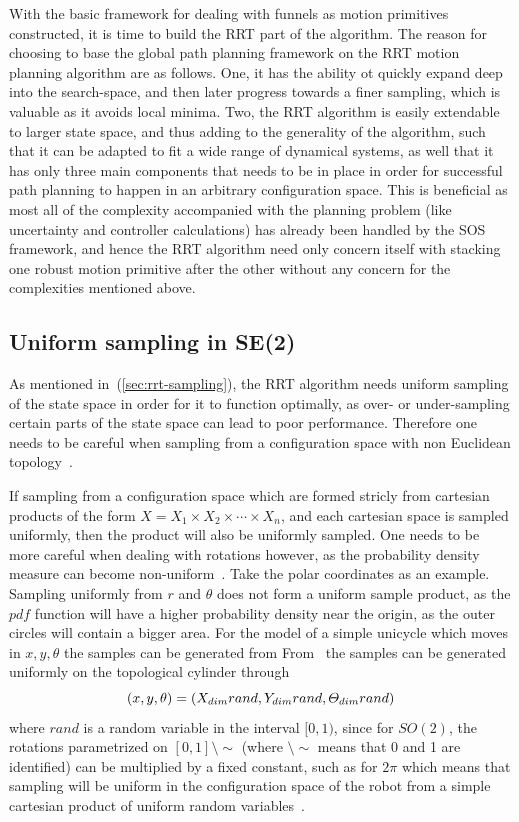 With the basic framework for dealing with funnels as motion primitives
constructed, it is time to build the \ac{RRT} part of the \rrtfunnel{}
algorithm. The reason for choosing to base the global path planning framework on
the \ac{RRT} motion planning algorithm are as follows. One, it has the ability
ot quickly expand deep into the search-space, and then later progress towards a
finer sampling, which is valuable as it avoids local minima. Two, the \ac{RRT}
algorithm is easily extendable to larger state space, and thus adding to the
generality of the \rrtfunnel{} algorithm, such that it can be adapted to fit a
wide range of dynamical systems, as well that it has only three main components
that needs to be in place in order for successful path planning to happen in an
arbitrary configuration space. This is beneficial as most all of the complexity
accompanied with the planning problem (like uncertainty and controller
calculations) has already been handled by the \ac{SOS} framework, and hence the
\ac{RRT} algorithm need only concern itself with stacking one robust motion
primitive after the other without any concern for the complexities mentioned
above.

\subsection{Uniform sampling in SE(2)}

As mentioned in~(\ref{sec:rrt-sampling}), the \ac{RRT} algorithm needs
uniform sampling of the state space in order for it to function optimally, as
over- or under-sampling certain parts of the state space can lead to poor
performance. Therefore one needs to be careful when sampling from a
configuration space with non Euclidean
topology~\cite{kuffnerEffectiveSamplingDistance2004}.

If sampling from a configuration space which are formed stricly from cartesian
products of the form \(X = X_1\times X_2\times \cdots \times X_n\), and each cartesian
space is sampled uniformly, then the product will also be uniformly sampled. One
needs to be more careful when dealing with rotations however, as the probability
density measure can become non-uniform~\cite{Lav06}. Take the polar coordinates
as an example. Sampling uniformly from \(r\) and \(\theta\) does not form a
uniform sample product, as the \(pdf\) function will have a higher probability
density near the origin, as the outer circles will contain a bigger area. For
the model of a simple unicycle which moves in \(x,y,\theta\) the samples can be
generated from From~\cite{kuffnerEffectiveSamplingDistance2004} the samples can
be generated uniformly on the topological cylinder through
\[
  (x,y,\theta) = (\mathnormal{X}_{dim}rand, \mathnormal{Y}_{dim}rand, \mathnormal{\Theta}_{dim}rand)
\]
where \(rand\) is a random variable in the interval \([0,1)\), since for
\(SO(2)\), the rotations parametrized on \([0,1]\setminus\sim\) (where
\(\setminus\sim\) means that 0 and 1 are identified) can be multiplied by a
fixed constant, such as for \(2\pi\) which means that sampling will be uniform
in the configuration space of the robot from a simple cartesian product of
uniform random variables~\cite{Lav06}.

